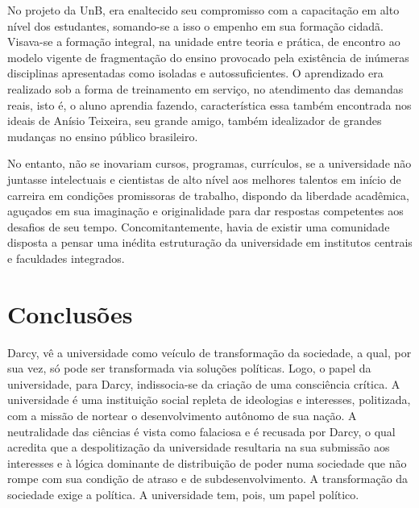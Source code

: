 \documentclass{sbrt}
\begin{document}
No projeto da UnB, era enaltecido seu compromisso com a capacitação em alto nível dos estudantes, somando-se a isso o empenho em sua formação cidadã. Visava-se a formação integral, na unidade entre teoria e prática, de encontro ao modelo vigente de fragmentação do ensino provocado pela existência de inúmeras disciplinas apresentadas como isoladas e autossuficientes. O aprendizado era realizado sob a forma de treinamento em serviço, no atendimento das demandas reais, isto é, o aluno aprendia fazendo, característica essa também encontrada nos ideais de Anísio Teixeira, seu grande amigo, também idealizador de grandes mudanças no ensino público brasileiro.

No entanto, não se inovariam cursos, programas, currículos, se a universidade não juntasse intelectuais e cientistas de alto nível aos melhores talentos em início de carreira em condições promissoras de trabalho, dispondo da liberdade acadêmica, aguçados em sua imaginação e originalidade para dar respostas competentes aos desafios de seu tempo. Concomitantemente, havia de existir uma comunidade disposta a pensar uma inédita estruturação da universidade em institutos centrais e faculdades integrados.


\section{Conclusões}

Darcy, vê a universidade como veículo de transformação da sociedade, a qual, por sua vez, só pode ser transformada via soluções políticas. Logo, o papel da universidade, para Darcy, indissocia-se da criação de uma consciência crítica. A universidade é uma instituição social repleta de ideologias e interesses, politizada, com a missão de nortear o desenvolvimento autônomo de sua nação. A neutralidade das ciências é vista como falaciosa e é recusada por Darcy, o qual acredita que a despolitização da universidade resultaria na sua submissão aos interesses e à lógica dominante de distribuição de poder numa sociedade que não rompe com sua condição de atraso e de subdesenvolvimento. A transformação da sociedade exige a política. A universidade tem, pois, um papel político.
\end{document}
